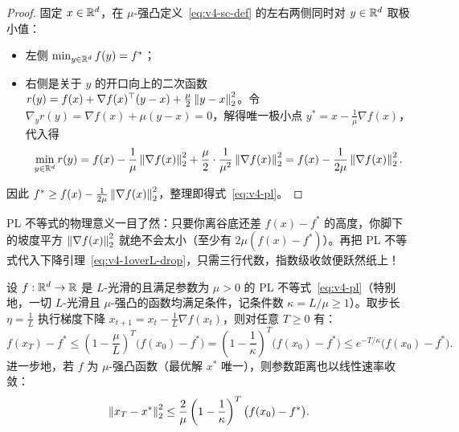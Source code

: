 \begin{proof}
固定 $x \in \mathbb{R}^d$，在 $\mu$-强凸定义~\eqref{eq:v4-sc-def} 的左右两侧同时对 $y \in \mathbb{R}^d$ 取极小值：
\begin{itemize}
  \item 左侧 $\min_{y\in\mathbb{R}^d} f(y) = f^*$；
  \item 右侧是关于 $y$ 的开口向上的二次函数 $r(y) = f(x) + \nabla f(x)^\top(y-x) + \frac{\mu}{2}\left\|y-x\right\|_2^2$。令 $\nabla_y r(y) = \nabla f(x) + \mu(y - x) = 0$，解得唯一极小点 $y^* = x - \frac{1}{\mu}\nabla f(x)$，代入得
  \[
    \min_{y\in\mathbb{R}^d} r(y) = f(x) - \frac{1}{\mu}\left\|\nabla f(x)\right\|_2^2 + \frac{\mu}{2}\cdot\frac{1}{\mu^2}\left\|\nabla f(x)\right\|_2^2 = f(x) - \frac{1}{2\mu}\left\|\nabla f(x)\right\|_2^2.
  \]
\end{itemize}
因此 $f^* \ge f(x) - \frac{1}{2\mu}\left\|\nabla f(x)\right\|_2^2$，整理即得式~\eqref{eq:v4-pl}。
\end{proof}

PL 不等式的物理意义一目了然：只要你离谷底还差 $f(x) - f^*$ 的高度，你脚下的坡度平方 $\left\|\nabla f(x)\right\|_2^2$ 就绝不会太小（至少有 $2\mu(f(x)-f^*)$）。再把 PL 不等式代入下降引理~\eqref{eq:v4-1overL-drop}，只需三行代数，指数级收敛便跃然纸上！

\begin{thmBox}
\begin{theorem}[光滑 PL / $\mu$-强凸函数的线性收敛定理]\label{thm:v4-linear-conv}
设 $f: \mathbb{R}^d \to \mathbb{R}$ 是 $L$-光滑的且满足参数为 $\mu > 0$ 的 PL 不等式~\eqref{eq:v4-pl}（特别地，一切 $L$-光滑且 $\mu$-强凸的函数均满足条件，记条件数 $\kappa = L/\mu \ge 1$）。取步长 $\eta = \frac{1}{L}$ 执行梯度下降 $x_{t+1} = x_t - \frac{1}{L}\nabla f(x_t)$，则对任意 $T \ge 0$ 有：
\begin{equation}\label{eq:v4-linear-rate}
  f(x_T) - f^* \le \left(1 - \frac{\mu}{L}\right)^T \big(f(x_0) - f^*\big) = \left(1 - \frac{1}{\kappa}\right)^T \big(f(x_0) - f^*\big) \le e^{-T/\kappa}\big(f(x_0) - f^*\big).
\end{equation}
进一步地，若 $f$ 为 $\mu$-强凸函数（最优解 $x^*$ 唯一），则参数距离也以线性速率收敛：
\begin{equation}\label{eq:v4-param-dist}
  \left\|x_T - x^*\right\|_2^2 \le \frac{2}{\mu}\left(1 - \frac{1}{\kappa}\right)^T \big(f(x_0) - f^*\big).
\end{equation}
\end{theorem}
\end{thmBox}

